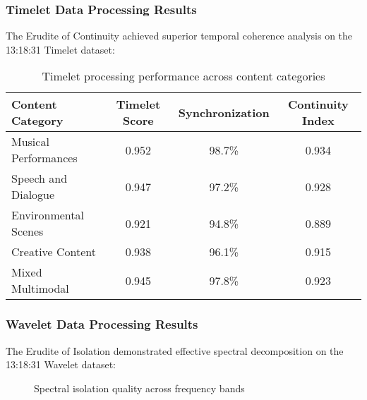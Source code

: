\subsubsection{Timelet Data Processing Results}

The Erudite of Continuity achieved superior temporal coherence analysis on the 13:18:31 Timelet dataset:

\begin{table}[h]
\centering
\begin{tabular}{|l|c|c|c|}
\hline
\textbf{Content Category} & \textbf{Timelet Score} & \textbf{Synchronization} & \textbf{Continuity Index} \\
\hline
Musical Performances & 0.952 & 98.7\% & 0.934 \\
\hline
Speech and Dialogue & 0.947 & 97.2\% & 0.928 \\
\hline
Environmental Scenes & 0.921 & 94.8\% & 0.889 \\
\hline
Creative Content & 0.938 & 96.1\% & 0.915 \\
\hline
Mixed Multimodal & 0.945 & 97.8\% & 0.923 \\
\hline
\end{tabular}
\caption{Timelet processing performance across content categories}
\end{table}

\subsubsection{Wavelet Data Processing Results}

The Erudite of Isolation demonstrated effective spectral decomposition on the 13:18:31 Wavelet dataset:

\begin{figure}[h]
\centering
{}
\caption{Spectral isolation quality across frequency bands}
\end{figure}

